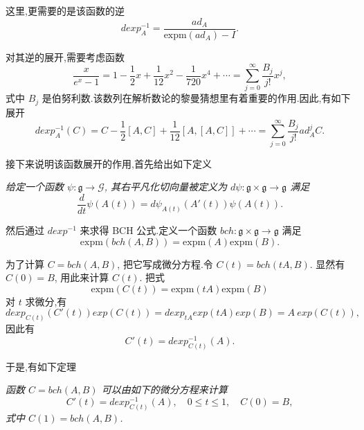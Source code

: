 这里,更需要的是该函数的逆
\begin{equation*}
	dexp_A^{-1}=\frac{ad_A}{\mbox{expm}(ad_A)-I}.
\end{equation*}

对其逆的展开,需要考虑函数
\begin{equation*}
	\frac{x}{e^x-1}=1-\frac{1}{2}x+\frac{1}{12}x^2-\frac{1}{720}x^4+\cdots=\sum_{j=0}^{\infty}\frac{B_j}{j!}x^j,
\end{equation*}
式中 $B_j$ 是伯努利数.该数列在解析数论的黎曼猜想里有着重要的作用.因此,有如下展开
\begin{equation*}
	dexp_A^{-1}(C)=C-\frac{1}{2}[A,C]+\frac{1}{12}[A,[A,C]]+\cdots=\sum_{j=0}^{\infty}\frac{B_j}{j!}ad^j_AC.
\end{equation*}

接下来说明该函数展开的作用,首先给出如下定义
\begin{definition}
	\emph{给定一个函数 $\psi:\mathfrak{g}\to\mathcal{G}$, 其右平凡化切向量被定义为 $d\psi:\mathfrak{g} \times \mathfrak{g} \to \mathfrak{g}$ 满足
	\begin{equation*}
		\frac{d}{dt}\psi(A(t))=d\psi_{A(t)}(A'(t))\psi(A(t)).
	\end{equation*}}
\end{definition}

然后通过 $dexp^{-1}$ 来求得 BCH 公式.定义一个函数 $bch:\mathfrak{g} \times \mathfrak{g} \to \mathfrak{g}$ 满足
\begin{equation*}
	\mbox{expm}(bch(A,B))=\mbox{expm}(A)\mbox{expm}(B).
\end{equation*}

为了计算 $C=bch(A,B)$, 把它写成微分方程.令 $C(t)=bch(tA,B)$. 显然有 $C(0)=B$, 用此来计算 $C(t)$. 把式
\begin{equation*}
	\mbox{expm}(C(t))=\mbox{expm}(tA)\mbox{expm}(B)
\end{equation*}
对 $t$ 求微分,有
\begin{equation*}
	dexp_{C(t)}(C'(t))exp(C(t))=dexp_{tA}exp(tA)exp(B)=A~exp(C(t)),
\end{equation*}
因此有
\begin{equation*}
	C'(t)=dexp_{C(t)}^{-1}(A).
\end{equation*}

于是,有如下定理
\begin{theorem}
	\emph{函数 $C=bch(A,B)$ 可以由如下的微分方程来计算
	\begin{equation*}
		C'(t)=dexp_{C(t)}^{-1}(A),\quad 0\leq t\leq 1,\quad C(0)=B,
	\end{equation*}
	式中 $C(1)=bch(A,B)$.}
\end{theorem}

